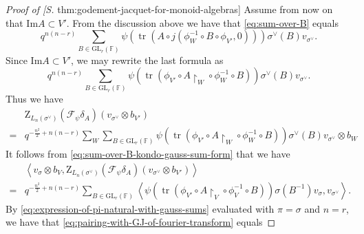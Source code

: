 \documentclass[12pt, reqno]{amsart}
\theoremstyle{definition}
\newcommand{\Cref}[1]{\zcref[S]{#1}}
\newcommand{\ImageOf}{\mathrm{Im}}
\newcommand{\zetaIntegral}{\mathrm{Z}}
\newcommand{\innerproduct}[2]{\left\langle #1,#2\right\rangle}
\newcommand{\fieldCharacter}{\psi}
\newcommand{\trace}{\operatorname{tr}}
\newcommand{\GL}{\mathrm{GL}}
\newcommand{\finiteField}{\mathbb{F}}
\newcommand{\fourierTransform}[1]{\mathcal{F}_{#1}}
\begin{document}
\begin{proof}[Proof of \Cref{thm:godement-jacquet-for-monoid-algebras}]
		Assume from now on that $\ImageOf A \subset V'$. From the discussion above we have that \eqref{eq:sum-over-B} equals
		\begin{displaymath}
			q^{n\left(n-r\right)} \sum_{B \in \GL_r\left(\finiteField\right)}
			\fieldCharacter\left(\trace\left(A \circ j\left(\phi_W^{-1} \circ B \circ \phi_{V'}, 0\right)\right)\right)  \sigma^{\vee}\left(B\right)v_{\sigma^{\vee}}.
		\end{displaymath}
		Since $\ImageOf A \subset V'$, we may rewrite the last formula as
		\begin{equation*}
			q^{n\left(n-r\right)} \sum_{B \in \GL_r\left(\finiteField\right)}
			\fieldCharacter\left(\trace\left(\phi_{V'} \circ A \restriction_W \circ \phi_W^{-1} \circ B\right)\right)  \sigma^{\vee}\left(B\right)v_{\sigma^{\vee}}.
		\end{equation*}
		Thus we have
		\begin{equation}\label{eq:sum-over-B-kondo-gauss-sum-form}
			\begin{split}
				&\zetaIntegral_{L_n\left(\sigma^{\vee}\right)}\left(\fourierTransform{\fieldCharacter}\delta_A\right)\left(v_{\sigma^{\vee}} \otimes b_{V'}\right)
				\\
				=& q^{-\frac{n^2}{2} + n\left(n-r\right)} \sum_{W} \sum_{B \in \GL_r\left(\finiteField\right)}
				\fieldCharacter\left(\trace\left(\phi_{V'} \circ A \restriction_W \circ \phi_W^{-1} \circ B\right)\right)  \sigma^{\vee}\left(B\right)v_{\sigma^{\vee}} \otimes b_W
			\end{split}
		\end{equation}
		It follows from \eqref{eq:sum-over-B-kondo-gauss-sum-form} that we have
		\begin{equation}\label{eq:pairing-with-GJ-of-fourier-transform}
			\begin{split}
				& \innerproduct{v_{\sigma} \otimes b_V}{\zetaIntegral_{L_n\left(\sigma^{\vee}\right)}\left(\fourierTransform{\fieldCharacter}\delta_A\right)\left(v_{\sigma^{\vee}} \otimes b_{V'}\right)} \\
				=& q^{-\frac{n^2}{2} + n\left(n-r\right)} \sum_{B \in \GL_r\left(\finiteField\right)}
				\innerproduct{\fieldCharacter\left(\trace\left(\phi_{V'} \circ A \restriction_V \circ \phi_V^{-1} \circ B\right)\right) \sigma\left(B^{-1}\right) v_{\sigma}}{v_{\sigma^{\vee}}}.
			\end{split}
		\end{equation}
		By \eqref{eq:expression-of-pi-natural-with-gauss-sums} evaluated with $\pi=\sigma$ and $n=r$, we have that \eqref{eq:pairing-with-GJ-of-fourier-transform} equals

\end{proof}
\end{document}
